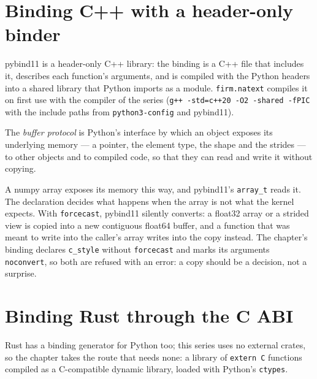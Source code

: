 \section{Binding C++ with a header-only binder}

pybind11 is a header-only C++ library: the binding is a C++ file that includes it, describes each function's arguments, and is compiled
with the Python headers into a shared library that Python imports as a module. \texttt{firm.natext} compiles it on first use with the
compiler of the series (\texttt{g++ -std=c++20 -O2 -shared -fPIC} with the include paths from \texttt{python3-config} and
pybind11).

\label{lst:pl:native-extensions:pybind}

\begin{definition}\label{def:pl:native-extensions:buffer}
The \emph{buffer protocol} is Python's interface by which an object exposes its underlying memory --- a pointer,
the element type, the shape and the strides --- to other objects and to compiled code, so that they can read and write it without
copying.
\end{definition}

A numpy array exposes its memory this way, and pybind11's \texttt{array\_t} reads it. The declaration decides what happens when the
array is not what the kernel expects. With \texttt{forcecast}, pybind11 silently converts: a float32 array or a strided view is copied
into a new contiguous float64 buffer, and a function that was meant to write into the caller's array writes into the copy instead. The
chapter's binding declares \texttt{c\_style} without \texttt{forcecast} and marks its arguments \texttt{noconvert}, so both are refused
with an error: a copy should be a decision, not a surprise.

\section{Binding Rust through the C ABI}

Rust has a binding generator for Python too; this series uses no external crates, so the chapter takes the route that needs none: a
library of \texttt{extern \textquotedbl{}C\textquotedbl{}} functions compiled as a C-compatible dynamic library, loaded with Python's \texttt{ctypes}.

